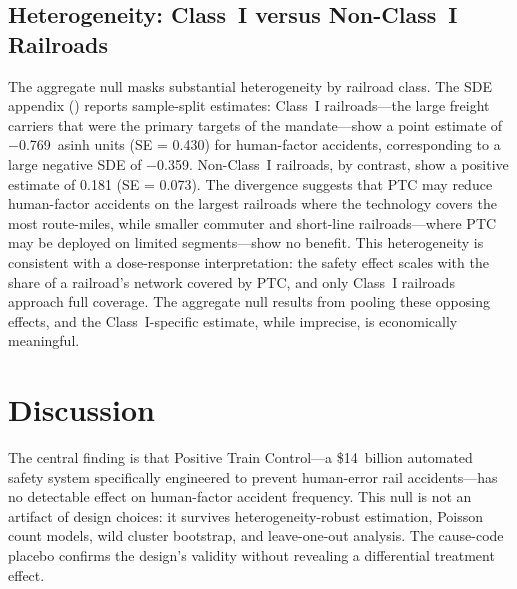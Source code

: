 \documentclass[12pt]{article}
\begin{document}


\subsection{Heterogeneity: Class~I versus Non-Class~I Railroads}

The aggregate null masks substantial heterogeneity by railroad class. The SDE appendix () reports sample-split estimates: Class~I railroads---the large freight carriers that were the primary targets of the mandate---show a point estimate of $-$0.769~asinh units (SE = 0.430) for human-factor accidents, corresponding to a large negative SDE of $-$0.359. Non-Class~I railroads, by contrast, show a positive estimate of 0.181 (SE = 0.073). The divergence suggests that PTC may reduce human-factor accidents on the largest railroads where the technology covers the most route-miles, while smaller commuter and short-line railroads---where PTC may be deployed on limited segments---show no benefit. This heterogeneity is consistent with a dose-response interpretation: the safety effect scales with the share of a railroad's network covered by PTC, and only Class~I railroads approach full coverage. The aggregate null results from pooling these opposing effects, and the Class~I-specific estimate, while imprecise, is economically meaningful.




\section{Discussion}
\label{sec:discussion}

The central finding is that Positive Train Control---a \$14~billion automated safety system specifically engineered to prevent human-error rail accidents---has no detectable effect on human-factor accident frequency. This null is not an artifact of design choices: it survives heterogeneity-robust estimation, Poisson count models, wild cluster bootstrap, and leave-one-out analysis. The cause-code placebo confirms the design's validity without revealing a differential treatment effect.
\end{document}
